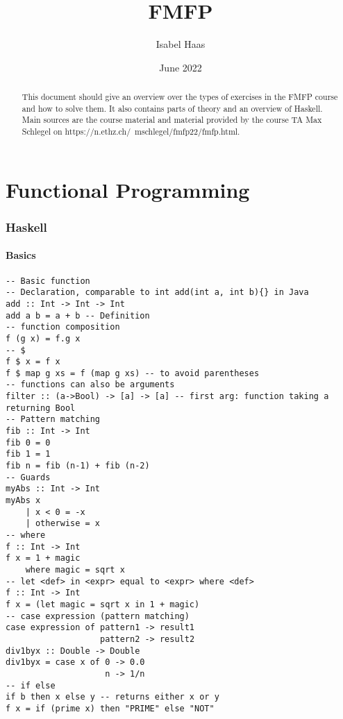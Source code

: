 \documentclass[12pt]{article}
\title{FMFP}
\author{Isabel Haas}
\date{June 2022}
\begin{document}

\begin{abstract}
This document should give an overview over the types of exercises in the FMFP course and how to solve them. 
It also contains parts of theory and an overview of Haskell. \\
Main sources are the course material and material provided by the course TA
Max Schlegel on https://n.ethz.ch/~mschlegel/fmfp22/fmfp.html.
\end{abstract}

\thispagestyle{empty}
\tableofcontents

\newpage

\part*{Functional Programming}
\setcounter{section}{0}
\renewcommand*{\theHsection}{chX.\the\value{section}}

\section{Haskell}
\setcounter{page}{1}
\subsection{Basics}
\begin{verbatim}
-- Basic function
-- Declaration, comparable to int add(int a, int b){} in Java
add :: Int -> Int -> Int 
add a b = a + b -- Definition
-- function composition
f (g x) = f.g x
-- $
f $ x = f x
f $ map g xs = f (map g xs) -- to avoid parentheses 
-- functions can also be arguments
filter :: (a->Bool) -> [a] -> [a] -- first arg: function taking a returning Bool
-- Pattern matching
fib :: Int -> Int
fib 0 = 0
fib 1 = 1
fib n = fib (n-1) + fib (n-2)
-- Guards
myAbs :: Int -> Int 
myAbs x
    | x < 0 = -x
    | otherwise = x
-- where 
f :: Int -> Int
f x = 1 + magic 
    where magic = sqrt x
-- let <def> in <expr> equal to <expr> where <def>
f :: Int -> Int
f x = (let magic = sqrt x in 1 + magic)
-- case expression (pattern matching)
case expression of pattern1 -> result1
                   pattern2 -> result2
div1byx :: Double -> Double
div1byx = case x of 0 -> 0.0
                    n -> 1/n
-- if else
if b then x else y -- returns either x or y
f x = if (prime x) then "PRIME" else "NOT" 
\end{verbatim}
\end{document}
